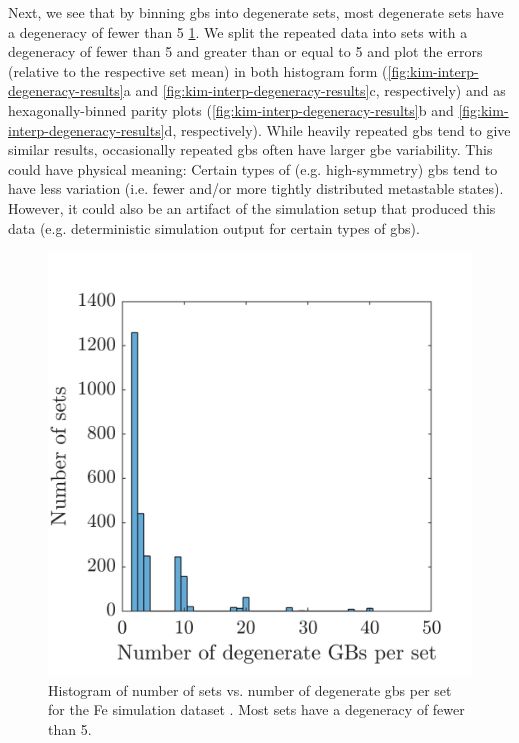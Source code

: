 \documentclass[preprint,12pt]{elsarticle}
\begin{document}
Next, we see that by binning \glspl{gb} into degenerate sets, most degenerate sets have a degeneracy of fewer than 5 \cref{fig:kim-interp-degeneracy-sets}. We split the repeated data into sets with a degeneracy of fewer than 5 and greater than or equal to 5 and plot the errors (relative to the respective set mean) in both histogram form (\cref{fig:kim-interp-degeneracy-results}a and \cref{fig:kim-interp-degeneracy-results}c, respectively) and as hexagonally-binned parity plots (\cref{fig:kim-interp-degeneracy-results}b and \cref{fig:kim-interp-degeneracy-results}d, respectively). While heavily repeated \glspl{gb} tend to give similar results, occasionally repeated \glspl{gb} often have larger \gls{gbe} variability. This could have physical meaning: Certain types of (e.g. high-symmetry) \glspl{gb} tend to have less variation (i.e. fewer and/or more tightly distributed metastable states). However, it could also be an artifact of the simulation setup that produced this data (e.g. deterministic simulation output for certain types of \glspl{gb}).

\begin{figure}
    \centering
    \includegraphics{kim-interp-degeneracy-sets.png}
    \caption{Histogram of number of sets vs. number of degenerate \glspl{gb} per set for the Fe simulation dataset \cite{kimPhasefieldModeling3D2014}. Most sets have a degeneracy of fewer than 5.}
    \label{fig:kim-interp-degeneracy-sets}
\end{figure}
\end{document}
